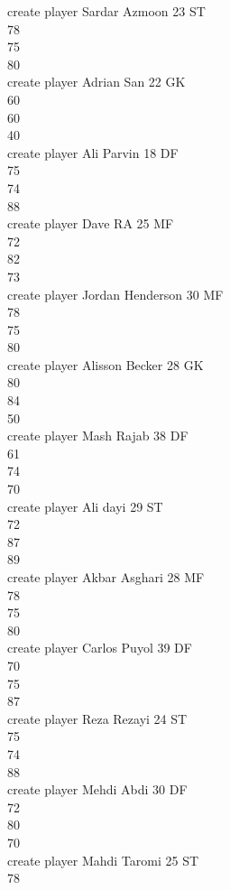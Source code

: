 \documentclass[]{article}
\begin{document}
{create player Sardar Azmoon 23 ST\\
78\\
75\\
80\\
create player Adrian San 22 GK\\
60\\
60\\
40\\
create player Ali Parvin 18 DF\\
75\\
74\\
88\\
create player Dave RA 25 MF\\
72\\
82\\
73\\
create player Jordan Henderson 30 MF\\
78\\
75\\
80\\
create player Alisson Becker 28 GK\\
80\\
84\\
50\\
create player Mash Rajab 38 DF\\
61\\
74\\
70\\
create player Ali dayi 29 ST\\
72\\
87\\
89\\
create player Akbar Asghari 28 MF\\
78\\
75\\
80\\
create player Carlos Puyol 39 DF\\
70\\
75\\
87\\
create player Reza Rezayi 24 ST\\
75\\
74\\
88\\
create player Mehdi Abdi 30 DF\\
72\\
80\\
70\\
create player Mahdi Taromi 25 ST\\
78\\
}
\end{document}
